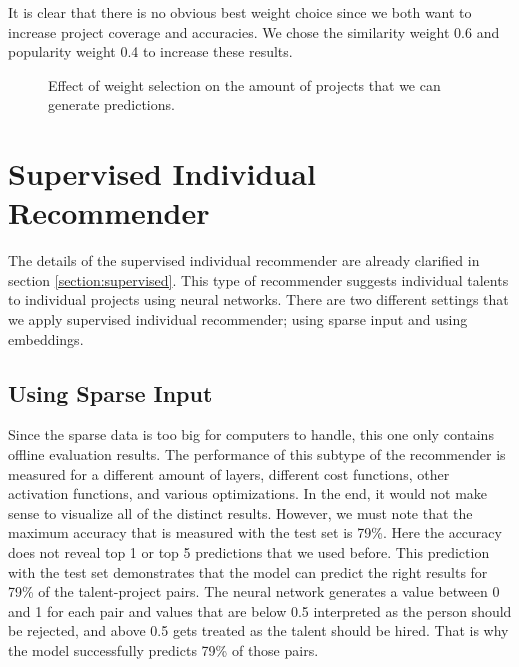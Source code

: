 It is clear that there is no obvious best weight choice since we both want to increase project coverage and accuracies. We chose the similarity weight 0.6 and popularity weight 0.4 to increase these results.

\begin{figure}[htp]
	\centering
	
	\exampleA
	\caption[Coverage figure]{Effect of weight selection on the amount of projects that we can generate predictions.}\label{fig:weight-selection-coverage}
\end{figure}


\section{Supervised Individual Recommender}

The details of the supervised individual recommender are already clarified in section \ref{section:supervised}. This type of recommender suggests individual talents to individual projects using neural networks. There are two different settings that we apply supervised individual recommender; using sparse input and using embeddings. 

\subsection{Using Sparse Input}

Since the sparse data is too big for computers to handle, this one only contains offline evaluation results. The performance of this subtype of the recommender is measured for a different amount of layers, different cost functions, other activation functions, and various optimizations. In the end, it would not make sense to visualize all of the distinct results. However, we must note that the maximum accuracy that is measured with the test set is 79\%. Here the accuracy does not reveal top 1 or top 5 predictions that we used before. This prediction with the test set demonstrates that the model can predict the right results for 79\% of the talent-project pairs. The neural network generates a value between 0 and 1 for each pair and values that are below 0.5 interpreted as the person should be rejected, and above 0.5 gets treated as the talent should be hired. That is why the model successfully predicts 79\% of those pairs.

